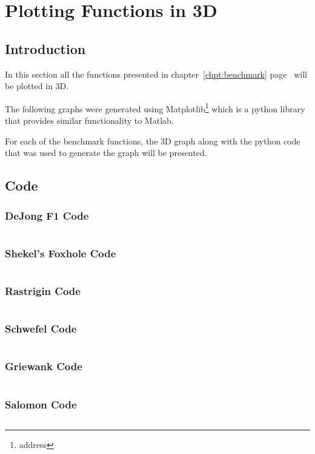 \appendix
\label{chpt:apxA}
\chapter{Plotting Functions in 3D}
\section{Introduction}
In this section all the functions presented in chapter~\ref{chpt:benchmark} page~\pageref{chpt:benchmark} will be plotted in 3D.

The following graphs were generated using Matplotlib\footnote{address} which is a python library that provides similar functionality to Matlab.

For each of the benchmark functions, the 3D graph along with the python code that was used to generate the graph will be presented.

\section{Code}
\subsection{DeJong F1 Code}
\inputminted[fontsize=\tiny]{python}{./Graphs/dejongf1.py}
\subsection{Shekel's Foxhole Code}
\inputminted[fontsize=\tiny]{python}{./Graphs/shekelsfoxhole.py}
\subsection{Rastrigin Code}
\inputminted[fontsize=\tiny]{python}{./Graphs/rastrigin.py}
\subsection{Schwefel Code}
\inputminted[fontsize=\tiny]{python}{./Graphs/Schwefel.py}
\subsection{Griewank Code}
\inputminted[fontsize=\tiny]{python}{./Graphs/Griewank.py}
\subsection{Salomon Code}
\inputminted[fontsize=\tiny]{python}{./Graphs/Salomon.py}
